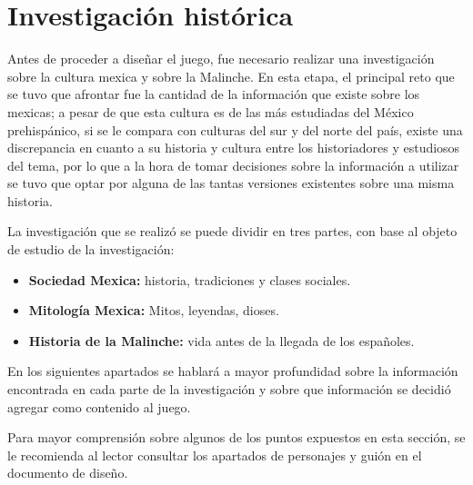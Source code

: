 \section{Investigación histórica}

Antes de proceder a diseñar el juego, fue necesario realizar una investigación
sobre la cultura mexica y sobre la Malinche. En esta etapa, el principal reto 
que se tuvo que afrontar fue la cantidad de la información que existe sobre 
los mexicas; a pesar de que esta cultura es de las más estudiadas del México
prehispánico, si se le compara con culturas del sur y del norte del país, existe 
una discrepancia en cuanto a su historia y cultura entre los historiadores y 
estudiosos del tema, por lo que a la hora de tomar decisiones sobre la información 
a utilizar se tuvo que optar por alguna de las tantas versiones existentes sobre 
una misma historia.
	\\
	\par
	La investigación que se realizó se puede dividir en tres partes, con base al 
	objeto de estudio de la investigación:
	\begin{itemize}
		\item \textbf{Sociedad Mexica:} historia, tradiciones y clases sociales.
		\item \textbf{Mitología Mexica:} Mitos, leyendas, dioses.
		\item \textbf{Historia de la Malinche:} vida antes de la llegada de los 
		españoles.
	\end{itemize}
	
	En los siguientes apartados se hablará a mayor profundidad sobre la información 
	encontrada en cada parte de la investigación y sobre que información se decidió
	agregar como contenido al juego.
	\\
	\par
	Para mayor comprensión sobre algunos de los puntos expuestos en esta 
	sección, se le recomienda al lector consultar los apartados de personajes y 
	guión en el documento de diseño.
	
